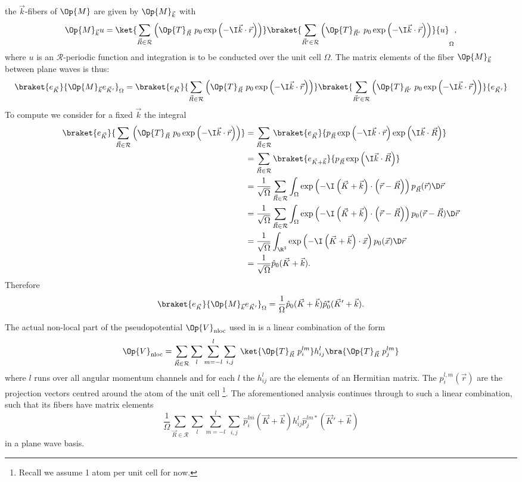\documentclass{MFHarticle}
\begin{document}
the $\vec{k}$-fibers of $\Op{M}$ are given by $\Op{M}_{\vec{k}}$ with
\[\Op{M}_{\vec{k}} u =
\ket{
\sum_{\vec{R} \in \mathcal{R}}
\left(
\Op{T}_{\vec{R}}\
p_0 \exp\left(-\I \vec{k} \cdot \vec{r}\right)\right)}
\braket{
\sum_{\vec{R}' \in \mathcal{R}}
\left(
\Op{T}_{\vec{R}'}\
p_0 \exp\left(-\I \vec{k} \cdot \vec{r}\right)\right)}
{u}_\Omega,
\]
where $u$ is an $\mathcal{R}$-periodic function
and integration is to be conducted over the unit cell $\Omega$.
The matrix elements of the fiber $\Op{M}_{\vec{k}}$
between plane waves is thus:
\[
\braket{e_{\vec{K}}}{\Op{M}_{\vec{k}} e_{\vec{K}'}}_\Omega
=
\braket{e_{\vec{K}}}{
\sum_{\vec{R} \in \mathcal{R}}
\left(
\Op{T}_{\vec{R}}\
p_0 \exp\left(-\I \vec{k} \cdot \vec{r}\right)\right)}
\braket{
\sum_{\vec{R}' \in \mathcal{R}}
\left(
\Op{T}_{\vec{R}'}\
p_0 \exp\left(-\I \vec{k} \cdot \vec{r}\right)\right)}
{e_{\vec{K}'}}
\]
To compute we consider for a fixed $\vec{k}$ the integral
\begin{align*}
\braket{e_{\vec{K}}}{
\sum_{\vec{R} \in \mathcal{R}}
\left(
\Op{T}_{\vec{R}}\
p_0 \exp\left(-\I \vec{k} \cdot \vec{r}\right)\right)}
&=
\sum_{\vec{R} \in \mathcal{R}}
\braket{e_{\vec{K}}}{p_{\vec{R}} \exp\left(-\I \vec{k} \cdot \vec{r}\right)
\exp\left(\I \vec{k} \cdot \vec{R}\right)} \\
&=
\sum_{\vec{R} \in \mathcal{R}}
\braket{e_{\vec{K} + \vec{k}}}{p_{\vec{R}}
\exp\left(\I \vec{k} \cdot \vec{R}\right)} \\
&= \frac1{\sqrt{\Omega}}
\sum_{\vec{R} \in \mathcal{R}}
\int_\Omega
\exp\left(-\I \left( \vec{K} + \vec{k} \right)
\cdot \left(\vec{r} - \vec{R}\right)\right)
p_{\vec{R}}(\vec{r}) \D\vec{r} \\
&= \frac1{\sqrt{\Omega}}
\sum_{\vec{R} \in \mathcal{R}}
\int_\Omega
\exp\left(-\I \left( \vec{K} + \vec{k} \right)
\cdot \left(\vec{r} - \vec{R}\right)\right)
p_0(\vec{r} - \vec{R}) \D\vec{r} \\
&= \frac1{\sqrt{\Omega}}
\int_{\R^3}
\exp\left(-\I \left( \vec{K} + \vec{k} \right)
\cdot \vec{x}\right)
p_0(\vec{x}) \D\vec{r} \\
&= \frac1{\sqrt{\Omega}} \hat{p}_0(\vec{K} + \vec{k}).
\end{align*}
Therefore
\[
\braket{e_{\vec{K}}}{\Op{M}_{\vec{k}} e_{\vec{K}'}}_\Omega
=\frac1{\Omega} \hat{p}_0(\vec{K} + \vec{k}) \hat{p}_0^\ast(\vec{K}' + \vec{k}).
\]

The actual non-local part of the pseudopotential
$\Op{V}_\text{nloc}$ used in \cite{Goedecker1996,Hartwigsen1998}
is a linear combination of the form
\[
	\Op{V}_\text{nloc} =
	\sum_{\vec{R} \in \mathcal{R}}
	\sum_{l}
	\sum_{m=-l}^l
	\sum_{i,j}\
	\ket{\Op{T}_{\vec{R}}\ p_i^{lm}} h_{ij}^l \bra{\Op{T}_{\vec{R}}\ p_j^{lm}}
\]
where $l$ runs over all angular momentum channels and
for each $l$ the $h_{ij}^l$
are the elements of an Hermitian matrix.
The $p_i^{l,m}(\vec{r})$ are the projection vectors
centred around the atom of the unit cell%
\footnote{Recall we assume 1 atom per unit cell for now.}.
The aforementioned analysis continues through to such a linear combination,
such that its fibers have matrix elements
\[
	\frac1{\Omega}
	\sum_{\vec{R} \in \mathcal{R}}
	\sum_{l}
	\sum_{m=-l}^l
	\sum_{i,j}\
	\hat{p}_i^{lm}(\vec{K} + \vec{k})
	h_{ij}^l
	\hat{p}_j^{lm \ast}(\vec{K}' + \vec{k})
\]
in a plane wave basis.
\end{document}
